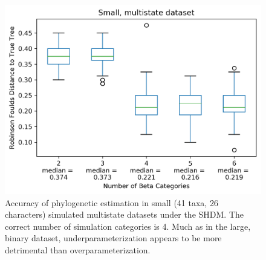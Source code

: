 \documentclass[]{article}
\begin{document}
\begin{figure}
  \caption{Accuracy of phylogenetic estimation in small (41 taxa, 26 characters) simulated multistate datasets under the SHDM. The correct number of simulation categories is 4. Much as in the large, binary dataset, underparameterization appears to be more detrimental than overparameterization.} 
    \includegraphics{fig/SmallMS}
\end{figure} 
\end{document}
